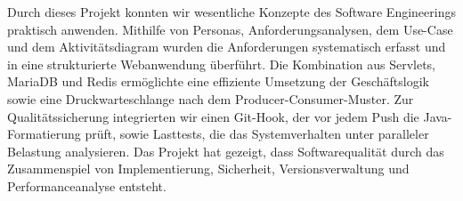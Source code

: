 Durch dieses Projekt konnten wir wesentliche Konzepte des Software Engineerings
praktisch anwenden. Mithilfe von Personas, Anforderungsanalysen, dem Use-Case und dem
Aktivitätsdiagram wurden die Anforderungen systematisch erfasst und in eine
strukturierte Webanwendung überführt. Die Kombination aus Servlets, MariaDB und
Redis ermöglichte eine effiziente Umsetzung der Geschäftslogik sowie eine
Druckwarteschlange nach dem Producer-Consumer-Muster. Zur Qualitätssicherung
integrierten wir einen Git-Hook, der vor jedem Push die Java-Formatierung prüft,
sowie Lasttests, die das Systemverhalten unter paralleler Belastung analysieren.
Das Projekt hat gezeigt, dass Softwarequalität durch das Zusammenspiel von
Implementierung, Sicherheit, Versionsverwaltung und Performanceanalyse entsteht.
